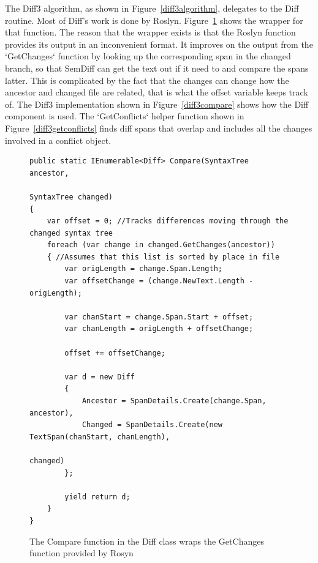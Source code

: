 \documentclass[draftclsnofoot,onecolumn]{IEEEtran}
\begin{document}
The Diff3 algorithm, as shown in Figure~\ref{diff3algorithm}, delegates to 
the Diff routine. Most of Diff’s work is done by Roslyn. 
Figure~\ref{diffcompare} shows the wrapper for that function. The reason that 
the wrapper exists is that the Roslyn function provides its output in an 
inconvenient format. It improves on the output from the `GetChanges` function 
by looking up the corresponding span in the changed branch, so that SemDiff 
can get the text out if it need to and compare the spans latter. This is 
complicated by the fact that the changes can change how the ancestor and 
changed file are related, that is what the offset variable keeps track of. 
The Diff3 implementation shown in Figure~\ref{diff3compare} shows how the 
Diff component is used. The `GetConflicts` helper function shown in 
Figure~\ref{diff3getconflicts} finds diff spans that overlap and includes all 
the changes involved in a conflict object.

\begin{figure}[!t]
\centering
\begin{lstlisting}
public static IEnumerable<Diff> Compare(SyntaxTree ancestor, 
                                                            SyntaxTree changed)
{
    var offset = 0; //Tracks differences moving through the changed syntax tree
    foreach (var change in changed.GetChanges(ancestor))
    { //Assumes that this list is sorted by place in file
        var origLength = change.Span.Length;
        var offsetChange = (change.NewText.Length - origLength);

        var chanStart = change.Span.Start + offset;
        var chanLength = origLength + offsetChange;

        offset += offsetChange;

        var d = new Diff
        {
            Ancestor = SpanDetails.Create(change.Span, ancestor),
            Changed = SpanDetails.Create(new TextSpan(chanStart, chanLength), 
			                                                           changed)
        };

        yield return d;
    }
}
\end{lstlisting}
\caption{The Compare function in the Diff class wraps the GetChanges function 
provided by Rosyn}
\label{diffcompare}
\end{figure}
\end{document}
